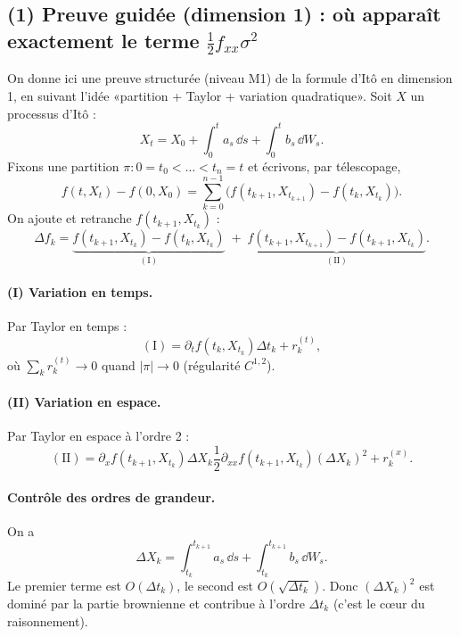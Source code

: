 
\subsection*{(1) Preuve guidée (dimension 1) : où apparaît exactement le terme $\tfrac12 f_{xx}\sigma^2$}
On donne ici une preuve structurée (niveau M1) de la formule d'Itô en dimension 1, en suivant l'idée «partition + Taylor + variation quadratique».
Soit $X$ un processus d'Itô :
\[
X_t=X_0+\int_0^t a_s\,\dd s+\int_0^t b_s\,\dd W_s.
\]
Fixons une partition $\pi:0=t_0<\dots<t_n=t$ et écrivons, par télescopage,
\[
f(t,X_t)-f(0,X_0)=\sum_{k=0}^{n-1}\Big(f(t_{k+1},X_{t_{k+1}})-f(t_k,X_{t_k})\Big).
\]
On ajoute et retranche $f(t_{k+1},X_{t_k})$ :
\[
\Delta f_k
=\underbrace{f(t_{k+1},X_{t_k})-f(t_k,X_{t_k})}_{(\mathrm{I})}
\;+\;\underbrace{f(t_{k+1},X_{t_{k+1}})-f(t_{k+1},X_{t_k})}_{(\mathrm{II})}.
\]

\paragraph{(I) Variation en temps.}
Par Taylor en temps :
\[
(\mathrm{I})=\partial_t f(t_k,X_{t_k})\Delta t_k + r_k^{(t)},
\]
où $\sum_k r_k^{(t)}\to 0$ quand $|\pi|\to 0$ (régularité $C^{1,2}$).

\paragraph{(II) Variation en espace.}
Par Taylor en espace à l'ordre 2 :
\[
(\mathrm{II})
=\partial_x f(t_{k+1},X_{t_k})\Delta X_k
\frac12\partial_{xx}f(t_{k+1},X_{t_k})(\Delta X_k)^2+r_k^{(x)}.
\]

\paragraph{Contrôle des ordres de grandeur.}
On a
\[
\Delta X_k = \int_{t_k}^{t_{k+1}} a_s\,\dd s + \int_{t_k}^{t_{k+1}} b_s\,\dd W_s.
\]
Le premier terme est $O(\Delta t_k)$, le second est $O(\sqrt{\Delta t_k})$.
Donc $(\Delta X_k)^2$ est dominé par la partie brownienne et contribue à l'ordre $\Delta t_k$ (c'est le c\oe{}ur du raisonnement).

